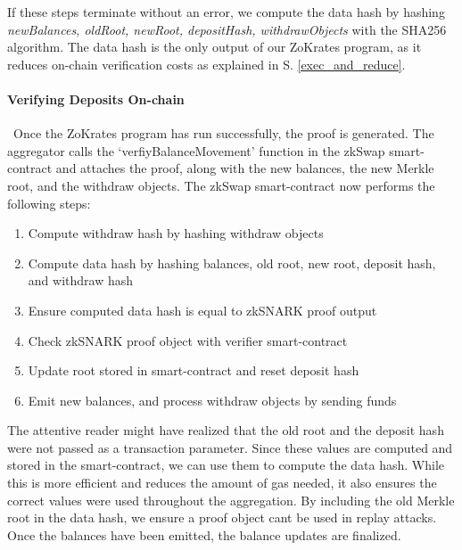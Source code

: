 \documentclass[../../thesis.tex]{subfiles}
\begin{document}
If these steps terminate without an error, we compute the data hash by hashing \textit{newBalances, oldRoot, newRoot, depositHash, withdrawObjects} with the SHA256 algorithm. The data hash is the only output of our ZoKrates program, as it reduces on-chain verification costs as explained in S. \ref{exec_and_reduce}.

\paragraph{Verifying Deposits On-chain} \
Once the ZoKrates program has run successfully, the proof is generated. The aggregator calls the `verfiyBalanceMovement' function in the zkSwap smart-contract and attaches the proof, along with the new balances, the new Merkle root, and the withdraw objects. The zkSwap smart-contract now performs the following steps:

\begin{enumerate}
    \item Compute withdraw hash by hashing withdraw objects
    \item Compute data hash by hashing balances, old root, new root, deposit hash, and withdraw hash
    \item Ensure computed data hash is equal to zkSNARK proof output
    \item Check zkSNARK proof object with verifier smart-contract
    \item Update root stored in smart-contract and reset deposit hash
    \item Emit new balances, and process withdraw objects by sending funds
\end{enumerate}

The attentive reader might have realized that the old root and the deposit hash were not passed as a transaction parameter. Since these values are computed and stored in the smart-contract, we can use them to compute the data hash. While this is more efficient and reduces the amount of gas needed, it also ensures the correct values were used throughout the aggregation. By including the old Merkle root in the data hash, we ensure a proof object cant be used in replay attacks. Once the balances have been emitted, the balance updates are finalized. 
\end{document}
